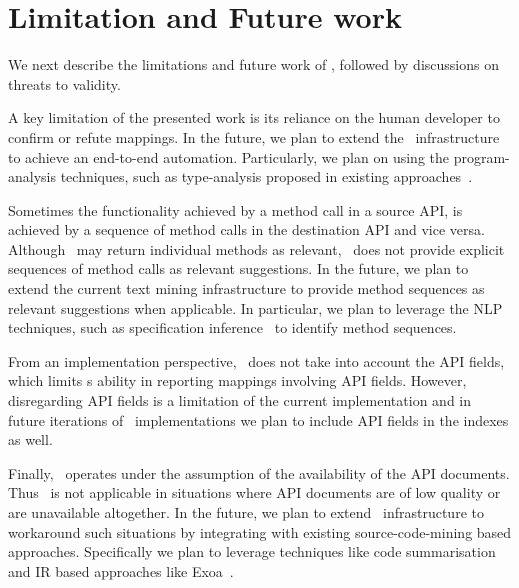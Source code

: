 \section{Limitation and Future work}
\label{sec:discussion}

We next describe the limitations and future work of \tool,
followed by discussions on threats to validity.


A key limitation of the presented work is its reliance on the human developer
to confirm or refute mappings.
In the future, we plan to extend the \tool\ infrastructure to achieve an end-to-end automation. 
Particularly, we plan on using the program-analysis techniques, 
such as type-analysis proposed in
existing approaches~\cite{nguyen2014statistical,zhong09SE}.



Sometimes the functionality achieved by a method call in a source API,
is achieved by a sequence of method calls in the destination API and vice versa.
Although \tool\ may return individual methods as relevant, 
\tool\ does not provide explicit sequences of method calls as relevant suggestions.
In the future, we plan to extend the current text mining infrastructure
to provide method sequences as relevant suggestions when applicable. 
In particular, we plan to leverage the NLP techniques, such as
specification inference~\cite{pandita12:inferring} to identify method sequences. 



From an implementation perspective, \tool\ does not take into account 
the API fields,
which limits \tool s ability in reporting mappings involving API fields.
However, disregarding API fields is a limitation of the current implementation 
and in future iterations of \tool\ implementations we plan to include API fields in the indexes as well.

Finally, \tool\ operates under the assumption of the availability of the API documents.
Thus \tool\ is not applicable in situations where API documents are of low quality or are unavailable altogether.
In the future, we plan to extend \tool\ infrastructure to workaround such situations
by integrating with existing source-code-mining based approaches.
Specifically we plan to leverage techniques like code summarisation~\cite{sridhara2011ICPC} and IR based approaches like Exoa~\cite{kim2010towards}.

